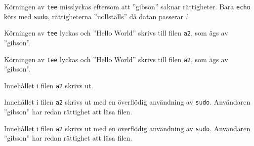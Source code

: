              {Körningen av \texttt{tee} misslyckas eftersom att ''gibson''
              saknar rättigheter. Bara \texttt{echo} körs med \texttt{sudo},
              rättigheterna ''nollställs'' då datan passerar \texttt{\|}.}

             {Körningen av \texttt{tee} lyckas och ''Hello World'' skrivs
              till filen \texttt{a2}, som ägs av ''gibson''.}

             {Körningen av \texttt{tee} lyckas och ''Hello World'' skrivs
              till filen \texttt{a2}, som ägs av ''gibson''.}

             {Innehållet i filen \texttt{a2} skrivs ut.}

             {Innehållet i filen \texttt{a2} skrivs ut med en överflödig
              användning av \texttt{sudo}. Användaren ''gibson'' har redan
              rättighet att läsa filen.}

             {Innehållet i filen \texttt{a2} skrivs ut med en överflödig
              användning av \texttt{sudo}. Användaren ''gibson'' har redan
              rättighet att läsa filen.}
